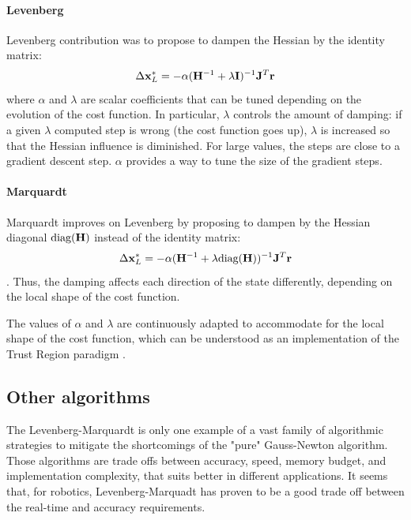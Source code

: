 \paragraph{Levenberg}
Levenberg \cite{levenberg1944method} contribution was to propose to dampen the Hessian by the identity matrix:
%
\begin{equation}
    \Delta {\bf x}_{L}^* = - \alpha ({\bf H}^{-1} + \lambda {\bf I})^{-1} {\bf J}^T {\bf r}
\end{equation}
%
where $\alpha$ and $\lambda$ are scalar coefficients that can be tuned depending on the evolution of the cost function. 
In particular, $\lambda$ controls the amount of damping: if a given $\lambda$ computed step is wrong (the cost function goes up),
$\lambda$ is increased so that the Hessian influence is diminished. For large values, the steps are close to a gradient descent step.
$\alpha$ provides a way to tune the size of the gradient steps.



\paragraph{Marquardt}
Marquardt \cite{marquardt1963algorithm} improves on Levenberg by proposing to dampen by the Hessian diagonal $\text{diag}({\bf H})$
instead of the identity matrix:
%
\begin{equation}
    \Delta {\bf x}_{L}^* = - \alpha ({\bf H}^{-1} + \lambda \text{diag}({\bf H}))^{-1} {\bf J}^T {\bf r}
\end{equation}.
Thus, the damping affects each direction of the state differently, depending on the local shape of the cost function.

The values of $\alpha$ and $\lambda$ are continuously adapted to accommodate for the local shape of the cost function, which can be understood as an implementation of the 
Trust Region paradigm \cite{boyd2004convex}. 

\subsection{Other algorithms}

The Levenberg-Marquardt is only one example of a vast family of algorithmic strategies 
to mitigate the shortcomings of the "pure" Gauss-Newton algorithm. Those algorithms are trade offs between accuracy, speed, memory budget, and implementation complexity, 
that suits better in different applications. It seems that, for robotics, Levenberg-Marquadt has proven to be a good trade off between the real-time and
accuracy requirements. 

